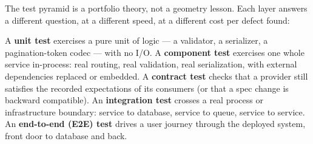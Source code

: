 The test pyramid is a portfolio theory, not a geometry lesson. Each layer
answers a different question, at a different speed, at a different cost per
defect found:

\begin{definition}
\label{def:test-layers}
A \textbf{unit test} exercises a pure unit of logic --- a validator, a
serializer, a pagination-token codec --- with no I/O. A \textbf{component
test} exercises one whole service in-process: real routing, real
validation, real serialization, with external dependencies replaced or
embedded. A \textbf{contract test} checks that a provider still satisfies
the recorded expectations of its consumers (or that a spec change is
backward compatible). An \textbf{integration test} crosses a real process
or infrastructure boundary: service to database, service to queue, service
to service. An \textbf{end-to-end (E2E) test} drives a user journey through
the deployed system, front door to database and back.
\end{definition}

